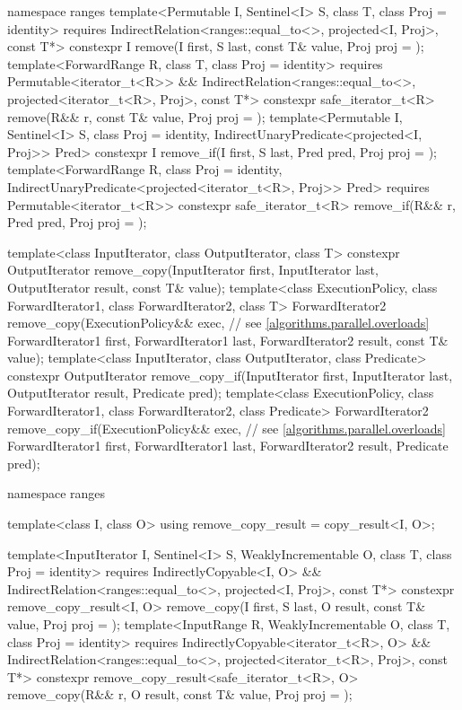 \begin{codeblock}
{  namespace ranges {
    template<Permutable I, Sentinel<I> S, class T, class Proj = identity>
      requires IndirectRelation<ranges::equal_to<>, projected<I, Proj>, const T*>
      constexpr I remove(I first, S last, const T& value, Proj proj = {});
    template<ForwardRange R, class T, class Proj = identity>
      requires Permutable<iterator_t<R>> &&
        IndirectRelation<ranges::equal_to<>, projected<iterator_t<R>, Proj>, const T*>
      constexpr safe_iterator_t<R>
        remove(R&& r, const T& value, Proj proj = {});
    template<Permutable I, Sentinel<I> S, class Proj = identity,
        IndirectUnaryPredicate<projected<I, Proj>> Pred>
      constexpr I remove_if(I first, S last, Pred pred, Proj proj = {});
    template<ForwardRange R, class Proj = identity,
        IndirectUnaryPredicate<projected<iterator_t<R>, Proj>> Pred>
      requires Permutable<iterator_t<R>>
      constexpr safe_iterator_t<R>
        remove_if(R&& r, Pred pred, Proj proj = {});
  }

  template<class InputIterator, class OutputIterator, class T>
    constexpr OutputIterator
      remove_copy(InputIterator first, InputIterator last,
                  OutputIterator result, const T& value);
  template<class ExecutionPolicy, class ForwardIterator1, class ForwardIterator2,
           class T>
    ForwardIterator2
      remove_copy(ExecutionPolicy&& exec, // see \ref{algorithms.parallel.overloads}
                  ForwardIterator1 first, ForwardIterator1 last,
                  ForwardIterator2 result, const T& value);
  template<class InputIterator, class OutputIterator, class Predicate>
    constexpr OutputIterator
      remove_copy_if(InputIterator first, InputIterator last,
                     OutputIterator result, Predicate pred);
  template<class ExecutionPolicy, class ForwardIterator1, class ForwardIterator2,
           class Predicate>
    ForwardIterator2
      remove_copy_if(ExecutionPolicy&& exec, // see \ref{algorithms.parallel.overloads}
                     ForwardIterator1 first, ForwardIterator1 last,
                     ForwardIterator2 result, Predicate pred);

  namespace ranges {
    template<class I, class O>
    using remove_copy_result = copy_result<I, O>;

    template<InputIterator I, Sentinel<I> S, WeaklyIncrementable O, class T,
        class Proj = identity>
      requires IndirectlyCopyable<I, O> &&
        IndirectRelation<ranges::equal_to<>, projected<I, Proj>, const T*>
      constexpr remove_copy_result<I, O>
        remove_copy(I first, S last, O result, const T& value, Proj proj = {});
    template<InputRange R, WeaklyIncrementable O, class T, class Proj = identity>
      requires IndirectlyCopyable<iterator_t<R>, O> &&
        IndirectRelation<ranges::equal_to<>, projected<iterator_t<R>, Proj>, const T*>
      constexpr remove_copy_result<safe_iterator_t<R>, O>
        remove_copy(R&& r, O result, const T& value, Proj proj = {});

}}
\end{codeblock}
